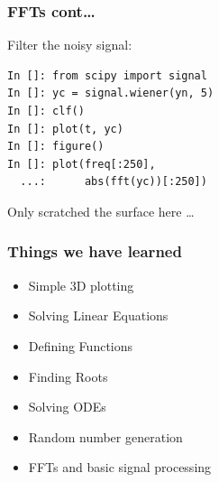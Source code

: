 \documentclass[14pt,compress]{beamer}
\begin{document}
\begin{frame}[fragile]
\frametitle{FFTs cont\dots}
Filter the noisy signal:
\begin{lstlisting}
In []: from scipy import signal
In []: yc = signal.wiener(yn, 5)
In []: clf()
In []: plot(t, yc)
In []: figure()
In []: plot(freq[:250], 
  ...:      abs(fft(yc))[:250])
\end{lstlisting}
Only scratched the surface here \dots
\end{frame}


\begin{frame}
  \frametitle{Things we have learned}
  \begin{itemize}
      \item Simple 3D plotting
  \item Solving Linear Equations
  \item Defining Functions
  \item Finding Roots
  \item Solving ODEs
  \item Random number generation
  \item FFTs and basic signal processing
  \end{itemize}
\end{frame}
\end{document}
